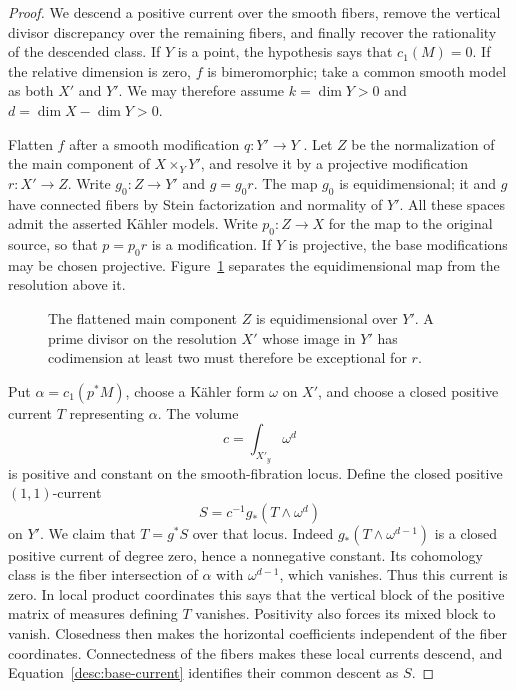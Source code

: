 \begin{proof}
We descend a positive current over the smooth fibers, remove the
vertical divisor discrepancy over the remaining fibers, and finally
recover the rationality of the descended class.
If $Y$ is a point, the hypothesis says that $c_1(M)=0$.
If the relative dimension is zero, $f$ is bimeromorphic; take a common
smooth model as both $X'$ and $Y'$.  We may therefore assume
$k=\dim Y>0$ and $d=\dim X-\dim Y>0$.

Flatten $f$ after a smooth modification $q:Y'\to Y$
\cite{HironakaFlattening}.
Let $Z$ be the normalization of the main component of $X\times_Y Y'$,
and resolve it by a projective modification $r:X'\to Z$.
Write $g_0:Z\to Y'$ and $g=g_0r$.  The map $g_0$ is equidimensional;
it and $g$ have connected fibers by Stein factorization and normality
of $Y'$.  All these spaces admit the asserted K\"ahler models.
Write $p_0:Z\to X$ for the map to the original source, so that
$p=p_0r$ is a modification.  If $Y$ is projective, the base
modifications may be chosen projective.  Figure~\ref{desc:diagram}
separates the equidimensional map from the resolution above it.

\begin{figure}[ht]
\centering
{}
\caption{The flattened main component $Z$ is equidimensional over
$Y'$.  A prime divisor on the resolution $X'$ whose image in $Y'$
has codimension at least two must therefore be exceptional for $r$.}
\label{desc:diagram}
\end{figure}

Put $\alpha=c_1(p^*M)$, choose a K\"ahler form $\omega$ on $X'$, and
choose a closed positive current $T$ representing $\alpha$.
The volume
\[
                  c=\int_{X'_y}\omega^d
\]
is positive and constant on the smooth-fibration locus.  Define the
closed positive $(1,1)$-current
\begin{equation}\label{desc:base-current}
                  S=c^{-1}g_*(T\wedge\omega^d)
\end{equation}
on $Y'$.  We claim that $T=g^*S$ over that locus.
Indeed $g_*(T\wedge\omega^{d-1})$ is a closed positive current of
degree zero, hence a nonnegative constant.  Its cohomology class is
the fiber intersection of $\alpha$ with $\omega^{d-1}$, which vanishes.
Thus this current is zero.  In local product coordinates this says
that the vertical block of the positive matrix of measures defining
$T$ vanishes.  Positivity also forces its mixed block to vanish.
Closedness then makes the horizontal coefficients independent of the
fiber coordinates.  Connectedness of the fibers makes these local
currents descend, and Equation~\eqref{desc:base-current} identifies
their common descent as $S$.


\end{proof}
